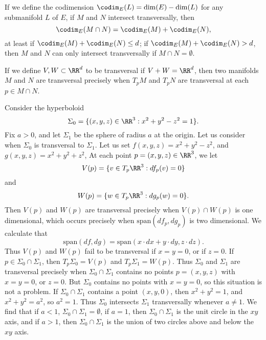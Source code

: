 \begin{remark}
    If we define the codimension $\codim_E(L) = \dim(E) - \dim(L)$ for any submanifold $L$ of $E$, if $M$ and $N$ intersect transversally, then
    \[ \codim_E(M \cap N) = \codim_E(M) + \codim_E(N), \]
    at least if $\codim_E(M) + \codim_E(N) \leq d$; if $\codim_E(M) + \codim_E(N) > d$, then $M$ and $N$ can only intersect transversally if $M \cap N = \emptyset$.
\end{remark}

\begin{remark}
    If we define $V,W \subset \RR^d$ to be transversal if $V + W = \RR^d$, then two manifolds $M$ and $N$ are transversal precisely when $T_p M$ and $T_p N$ are transversal at each $p \in M \cap N$.
\end{remark}

\begin{example}
    Consider the hyperboloid
    \[ \Sigma_0 = \{ (x,y,z) \in \RR^3 : x^2 + y^2 - z^2 = 1 \}. \]
    Fix $a > 0$, and let $\Sigma_1$ be the sphere of radius $a$ at the origin. Let us consider when $\Sigma_0$ is transversal to $\Sigma_1$. Let us set $f(x,y,z) = x^2 + y^2 - z^2$, and $g(x,y,z) = x^2 + y^2 + z^2$, At each point $p = (x,y,z) \in \RR^3$, we let
    \[ V(p) = \{ v \in T_p \RR^3 : df_p(v) = 0 \} \]
    and
    \[ W(p) = \{ w \in T_p \RR^3 : dg_p(w) = 0 \}. \]
    Then $V(p)$ and $W(p)$ are transversal precisely when $V(p) \cap W(p)$ is one dimensional, which occurs precisely when $\text{span}(df_p,dg_p)$ is two dimensional. We calculate that
    \[ \text{span}(df,dg) = \text{span}(x \cdot dx + y \cdot dy, z \cdot dz). \]
    Thus $V(p)$ and $W(p)$ fail to be transversal if $x = y = 0$, or if $z = 0$. If $p \in \Sigma_0 \cap \Sigma_1$, then $T_p \Sigma_0 = V(p)$ and $T_p \Sigma_1 = W(p)$. Thus $\Sigma_0$ and $\Sigma_1$ are transversal precisely when $\Sigma_0 \cap \Sigma_1$ contains no points $p = (x,y,z)$ with $x = y = 0$, or $z = 0$. But $\Sigma_0$ contains no points with $x = y = 0$, so this situation is not a problem. If $\Sigma_0 \cap \Sigma_1$ contains a point $(x,y,0)$, then $x^2 + y^2 = 1$, and $x^2 + y^2 = a^2$, so $a^2 = 1$. Thus $\Sigma_0$ intersects $\Sigma_1$ transversally whenever $a \neq 1$. We find that if $a < 1$, $\Sigma_0 \cap \Sigma_1 = \emptyset$, if $a = 1$, then $\Sigma_0 \cap \Sigma_1$ is the unit circle in the $xy$ axis, and if $a > 1$, then $\Sigma_0 \cap \Sigma_1$ is the union of two circles above and below the $xy$ axis.
\end{example}

